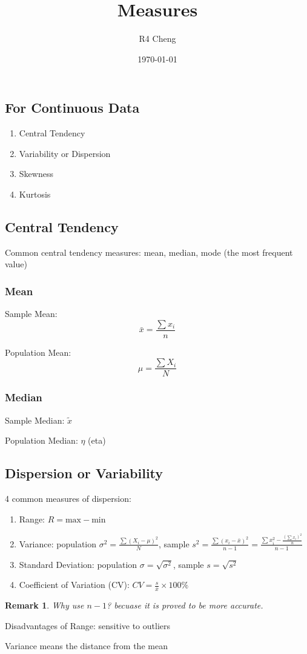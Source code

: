 \documentclass[12pt,a4paper]{article}
\title{Measures}
\author{R4 Cheng}
\date{\today}
\newtheorem*{rem}{Remark}
\newcommand{\Remark}[1]{
  \begin{rem}
    \color{cyan}
    #1
  \end{rem}
}
\begin{document}
\maketitle

\subsection*{For Continuous Data}

\begin{enumerate}
    \item Central Tendency
    \item Variability or Dispersion
    \item Skewness
    \item Kurtosis
\end{enumerate}

\subsection*{Central Tendency}

Common central tendency measures: mean, median, mode (the most frequent value)

\subsubsection*{Mean}

Sample Mean:
\[
\bar{x} = \frac{\sum x_i}{n}
\]

Population Mean:
\[
\mu = \frac{\sum X_i}{N}
\]

\subsubsection*{Median}

Sample Median: $\tilde{x}$

Population Median: $\eta$ (eta)

\subsection*{Dispersion or Variability}

4 common measures of dispersion:

\begin{enumerate}
    \item Range: $R = \text{max} - \text{min}$
    \item Variance: population $\sigma^2 = \frac{\sum (X_i - \mu)^2}{N}$, sample $s^2 = \frac{\sum (x_i - \bar{x})^2}{n-1} = \frac{\sum x_i^2 - \frac{(\sum x_i)^2}{n}}{n-1} $
    \item Standard Deviation: population $\sigma = \sqrt{\sigma^2}$, sample $s = \sqrt{s^2}$
    \item Coefficient of Variation (CV): $CV = \frac{s}{\bar{x}} \times 100\%$
\end{enumerate}

\Remark{Why use $n-1$? becuase it is proved to be more accurate.}

Disadvantages of Range: sensitive to outliers

Variance means the distance from the mean
\end{document}
